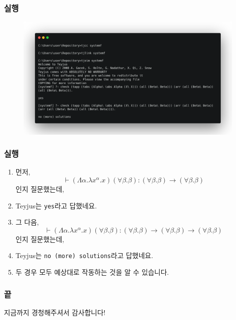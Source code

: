 \documentclass[slidestop,compress,mathserif]{beamer}
\begin{document}
    \begin{frame}
        \frametitle{실행}
        \begin{figure}[h]
            \begin{center}
                \includegraphics[width=1.0\linewidth]{fin.png}
            \end{center}
        \end{figure}
    \end{frame}

    \begin{frame}
        \frametitle{실행}
        \begin{enumerate}
            \item 먼저, $$\vdash \left( \Lambda \alpha . \lambda x^{\alpha} . x \right) \left( \forall \beta . \beta \right) : \left( \forall \beta . \beta \right) \to \left( \forall \beta . \beta \right)$$인지 질문했는데,
            \item Teyjus는 \texttt{yes}라고 답했네요.
            \item 그 다음, $$\vdash \left( \Lambda \alpha . \lambda x^{\alpha} . x \right) \left( \forall \beta . \beta \right) : \left( \forall \beta . \beta \right) \to \left( \forall \beta . \beta \right) \to \left( \forall \beta . \beta \right)$$인지 질문했는데,
            \item Teyjus는 \texttt{no (more) solutions}라고 답했네요.
            \item 두 경우 모두 예상대로 작동하는 것을 알 수 있습니다.
        \end{enumerate}
    \end{frame}
    
    \begin{frame}[c]
        \frametitle{끝}
        \centering
        지금까지 경청해주셔서 감사합니다!
    \end{frame}
\end{document}
